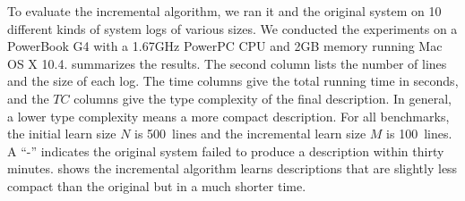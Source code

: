

To evaluate the incremental algorithm, we ran it and the
original \learnpads{} system on 10 different kinds of system logs
of various sizes.  We conducted the experiments on a PowerBook G4 with
a 1.67GHz PowerPC CPU and 2GB memory running Mac OS X 10.4. 
 summarizes the results.  The second column
lists the number of lines and the size of each log. 
The time columns give the total
running time in seconds, and the $TC$ columns give the type complexity
of the final description. In general, a lower type complexity means a
more compact description. For all benchmarks, the initial learn size $N$ is 500~lines 
and the incremental learn size $M$ is 100~lines. 
A ``-'' indicates the original system failed to produce a description
within thirty minutes.  shows 
the incremental algorithm learns descriptions that are slightly less compact than the
original but in a much shorter time. 


